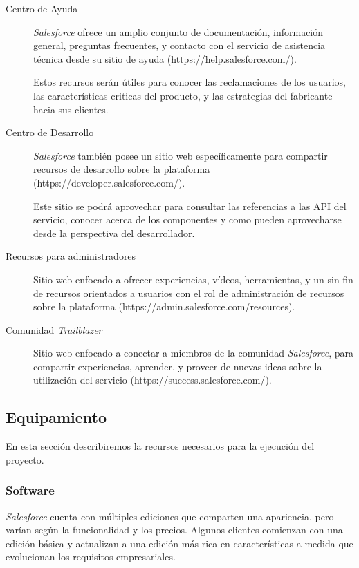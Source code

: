 \begin{description}
\item [Centro de Ayuda] \emph{Salesforce} ofrece un amplio conjunto de
documentación, información general, preguntas frecuentes, y contacto con el
servicio de asistencia técnica desde su sitio de ayuda
(https://help.salesforce.com/).

Estos recursos serán útiles para conocer las reclamaciones de los usuarios, las
características criticas del producto, y las estrategias del fabricante hacia
sus clientes.

\item [Centro de Desarrollo] \emph{Salesforce} también posee un sitio web
específicamente para compartir recursos de desarrollo sobre la plataforma
(https://developer.salesforce.com/).

Este sitio se podrá aprovechar para consultar las referencias a las API del
servicio, conocer acerca de los componentes y como pueden aprovecharse desde la
perspectiva del desarrollador.

\item [Recursos para administradores] Sitio web enfocado a ofrecer experiencias,
vídeos, herramientas, y un sin fin de recursos orientados a usuarios con el rol
de administración de recursos sobre la plataforma
(https://admin.salesforce.com/resources).

\item [Comunidad \emph{Trailblazer}] Sitio web enfocado a conectar a miembros de
la comunidad \emph{Salesforce}, para compartir experiencias, aprender, y proveer
de nuevas ideas sobre la utilización del servicio
(https://success.salesforce.com/).

\end{description}

\subsection{Equipamiento}
En esta sección describiremos la recursos necesarios para la ejecución del
proyecto.

\subsubsection{Software}
\emph{Salesforce} cuenta con múltiples ediciones que comparten una apariencia,
pero varían según la funcionalidad y los precios. Algunos clientes comienzan con
una edición básica y actualizan a una edición más rica en características a
medida que evolucionan los requisitos empresariales.

